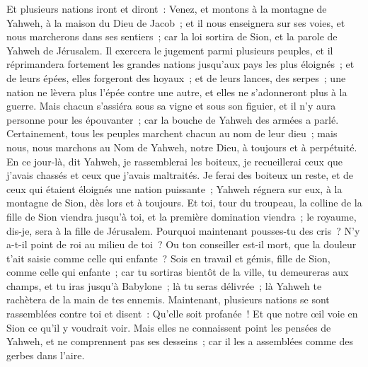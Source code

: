 \begin{multicols}{2}
Et plusieurs nations iront et diront~: Venez, et montons à la montagne de Yahweh, à la maison du Dieu de Jacob~; et il nous enseignera sur ses voies, et nous marcherons dans ses sentiers~; car la loi sortira de Sion, et la parole de Yahweh de Jérusalem.
Il exercera le jugement parmi plusieurs peuples, et il réprimandera fortement les grandes nations jusqu'aux pays les plus éloignés~; et de leurs épées, elles forgeront des hoyaux~; et de leurs lances, des serpes~; une nation ne lèvera plus l'épée contre une autre, et elles ne s'adonneront plus à la guerre.
Mais chacun s'assiéra sous sa vigne et sous son figuier, et il n'y aura personne pour les épouvanter~; car la bouche de Yahweh des armées a parlé.
Certainement, tous les peuples marchent chacun au nom de leur dieu~; mais nous, nous marchons au Nom de Yahweh, notre Dieu, à toujours et à perpétuité.
En ce jour-là, dit Yahweh, je rassemblerai les boiteux, je recueillerai ceux que j'avais chassés et ceux que j'avais maltraités.
Je ferai des boiteux un reste, et de ceux qui étaient éloignés une nation puissante~; Yahweh régnera sur eux, à la montagne de Sion, dès lors et à toujours.
Et toi, tour du troupeau, la colline de la fille de Sion viendra jusqu'à toi, et la première domination viendra~; le royaume, dis-je, sera à la fille de Jérusalem.
Pourquoi maintenant pousses-tu des cris~? N'y a-t-il point de roi au milieu de toi~? Ou ton conseiller est-il mort, que la douleur t'ait saisie comme celle qui enfante~?
Sois en travail et gémis, fille de Sion, comme celle qui enfante~; car tu sortiras bientôt de la ville, tu demeureras aux champs, et tu iras jusqu'à Babylone~; là tu seras délivrée~; là Yahweh te rachètera de la main de tes ennemis.
Maintenant, plusieurs nations se sont rassemblées contre toi et disent~: Qu'elle soit profanée~! Et que notre œil voie en Sion ce qu'il y voudrait voir.
Mais elles ne connaissent point les pensées de Yahweh, et ne comprennent pas ses desseins~; car il les a assemblées comme des gerbes dans l'aire.

\end{multicols}
